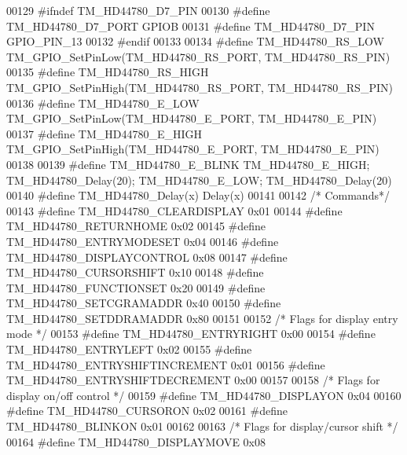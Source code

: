 \begin{DoxyCode}
00129 \textcolor{preprocessor}{#ifndef TM\_HD44780\_D7\_PIN}
00130 \textcolor{preprocessor}{#define TM\_HD44780\_D7\_PORT              GPIOB}
00131 \textcolor{preprocessor}{#define TM\_HD44780\_D7\_PIN               GPIO\_PIN\_13}
00132 \textcolor{preprocessor}{#endif}
00133 
00134 \textcolor{preprocessor}{#define TM\_HD44780\_RS\_LOW               TM\_GPIO\_SetPinLow(TM\_HD44780\_RS\_PORT, TM\_HD44780\_RS\_PIN)}
00135 \textcolor{preprocessor}{#define TM\_HD44780\_RS\_HIGH              TM\_GPIO\_SetPinHigh(TM\_HD44780\_RS\_PORT, TM\_HD44780\_RS\_PIN)}
00136 \textcolor{preprocessor}{#define TM\_HD44780\_E\_LOW                TM\_GPIO\_SetPinLow(TM\_HD44780\_E\_PORT, TM\_HD44780\_E\_PIN)}
00137 \textcolor{preprocessor}{#define TM\_HD44780\_E\_HIGH               TM\_GPIO\_SetPinHigh(TM\_HD44780\_E\_PORT, TM\_HD44780\_E\_PIN)}
00138 
00139 \textcolor{preprocessor}{#define TM\_HD44780\_E\_BLINK              TM\_HD44780\_E\_HIGH; TM\_HD44780\_Delay(20); TM\_HD44780\_E\_LOW;
       TM\_HD44780\_Delay(20)}
00140 \textcolor{preprocessor}{#define TM\_HD44780\_Delay(x)             Delay(x)}
00141 
00142 \textcolor{comment}{/* Commands*/}
00143 \textcolor{preprocessor}{#define TM\_HD44780\_CLEARDISPLAY         0x01}
00144 \textcolor{preprocessor}{#define TM\_HD44780\_RETURNHOME           0x02}
00145 \textcolor{preprocessor}{#define TM\_HD44780\_ENTRYMODESET         0x04}
00146 \textcolor{preprocessor}{#define TM\_HD44780\_DISPLAYCONTROL       0x08}
00147 \textcolor{preprocessor}{#define TM\_HD44780\_CURSORSHIFT          0x10}
00148 \textcolor{preprocessor}{#define TM\_HD44780\_FUNCTIONSET          0x20}
00149 \textcolor{preprocessor}{#define TM\_HD44780\_SETCGRAMADDR         0x40}
00150 \textcolor{preprocessor}{#define TM\_HD44780\_SETDDRAMADDR         0x80}
00151 
00152 \textcolor{comment}{/* Flags for display entry mode */}
00153 \textcolor{preprocessor}{#define TM\_HD44780\_ENTRYRIGHT           0x00}
00154 \textcolor{preprocessor}{#define TM\_HD44780\_ENTRYLEFT            0x02}
00155 \textcolor{preprocessor}{#define TM\_HD44780\_ENTRYSHIFTINCREMENT  0x01}
00156 \textcolor{preprocessor}{#define TM\_HD44780\_ENTRYSHIFTDECREMENT  0x00}
00157 
00158 \textcolor{comment}{/* Flags for display on/off control */}
00159 \textcolor{preprocessor}{#define TM\_HD44780\_DISPLAYON            0x04}
00160 \textcolor{preprocessor}{#define TM\_HD44780\_CURSORON             0x02}
00161 \textcolor{preprocessor}{#define TM\_HD44780\_BLINKON              0x01}
00162 
00163 \textcolor{comment}{/* Flags for display/cursor shift */}
00164 \textcolor{preprocessor}{#define TM\_HD44780\_DISPLAYMOVE          0x08}

\end{DoxyCode}
